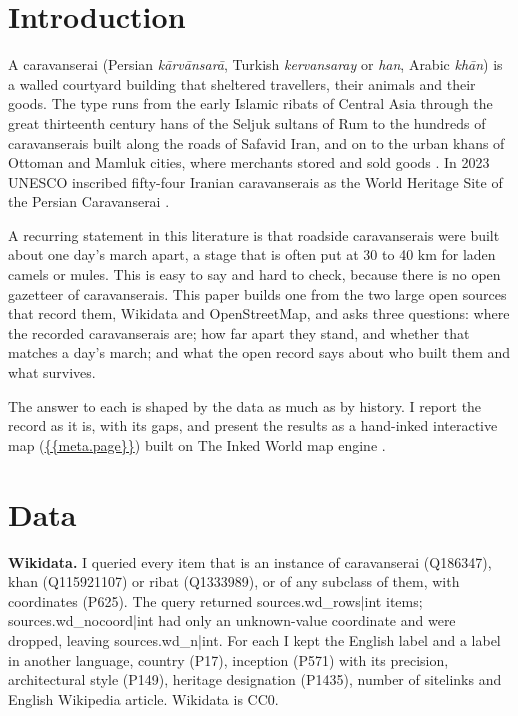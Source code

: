 \documentclass[11pt,a4paper]{article}
\begin{document}
\section{Introduction}
A caravanserai (Persian \emph{k\=arv\=ansar\=a}, Turkish \emph{kervansaray} or \emph{han}, Arabic \emph{kh\=an}) is a walled courtyard building that sheltered travellers, their animals and their goods. The type runs from the early Islamic ribats of Central Asia through the great thirteenth century hans of the Seljuk sultans of Rum to the hundreds of caravanserais built along the roads of Safavid Iran, and on to the urban khans of Ottoman and Mamluk cities, where merchants stored and sold goods \citep{erdmann1961,siroux1949,kiani1990,hillenbrand1994,constable2003}. In 2023 UNESCO inscribed fifty-four Iranian caravanserais as the World Heritage Site of the Persian Caravanserai \citep{unesco2023}.

A recurring statement in this literature is that roadside caravanserais were built about one day's march apart, a stage that is often put at 30 to 40 km for laden camels or mules. This is easy to say and hard to check, because there is no open gazetteer of caravanserais. This paper builds one from the two large open sources that record them, Wikidata and OpenStreetMap, and asks three questions: where the recorded caravanserais are; how far apart they stand, and whether that matches a day's march; and what the open record says about who built them and what survives.

The answer to each is shaped by the data as much as by history. I report the record as it is, with its gaps, and present the results as a hand-inked interactive map (\url{{{meta.page}}}) built on The Inked World map engine \citep{inkmap}.

\section{Data}
\textbf{Wikidata.} I queried every item that is an instance of caravanserai (Q186347), khan (Q115921107) or ribat (Q1333989), or of any subclass of them, with coordinates (P625). The query returned {{sources.wd_rows|int}} items; {{sources.wd_nocoord|int}} had only an unknown-value coordinate and were dropped, leaving {{sources.wd_n|int}}. For each I kept the English label and a label in another language, country (P17), inception (P571) with its precision, architectural style (P149), heritage designation (P1435), number of sitelinks and English Wikipedia article. Wikidata is CC0.
\end{document}
